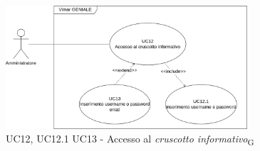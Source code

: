 \begin{figure}[H]
\centering
\includegraphics[width=0.8\textwidth]{contents/casi_duso/png/UC12.png}
\caption{UC12, UC12.1 UC13 - Accesso al \textit{cruscotto informativo}\textsubscript{G} }
\end{figure}

